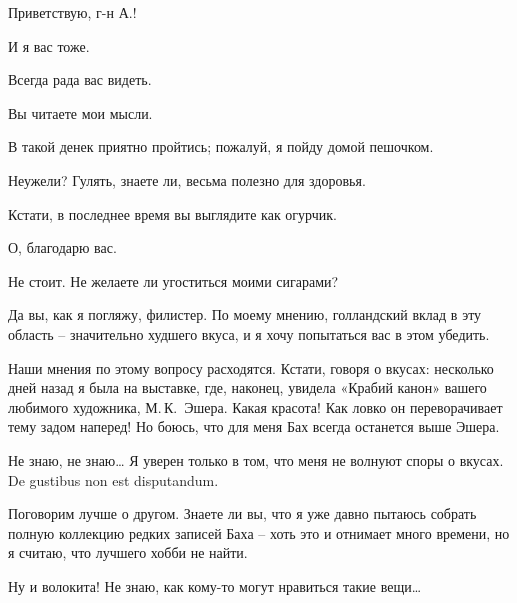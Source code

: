 \documentclass[../main.tex]{subfiles}
\begin{document}


\begin{dialogue}

 Приветствую, г-н А.!

 И я вас тоже.

 Всегда рада вас видеть.

 Вы читаете мои мысли.

 В такой денек приятно пройтись; пожалуй, я пойду домой пешочком.

 Неужели? Гулять, знаете ли, весьма полезно для здоровья.

 Кстати, в последнее время вы выглядите как огурчик.

 О, благодарю вас.

 Не стоит. Не желаете ли угоститься моими сигарами?

 Да вы, как я погляжу, филистер. По моему мнению, голландский вклад в эту область \--- значительно худшего вкуса, и я хочу попытаться вас в этом убедить.

 Наши мнения по этому вопросу расходятся. Кстати, говоря о вкусах: несколько дней назад я была на выставке, где, наконец, увидела «Крабий канон» вашего любимого художника, М.\,К.~Эшера. Какая красота! Как ловко он переворачивает тему задом наперед! Но боюсь, что для меня Бах всегда останется выше Эшера.

 Не знаю, не знаю\ldots{} Я уверен только в том, что меня не волнуют споры о вкусах. De gustibus non est disputandum.

 Поговорим лучше о другом. Знаете ли вы, что я уже давно пытаюсь собрать полную коллекцию редких записей Баха \--- хоть это и отнимает много времени, но я считаю, что лучшего хобби не найти.

 Ну и волокита! Не знаю, как кому-то могут нравиться такие вещи\ldots{}



\end{dialogue}
\end{document}
